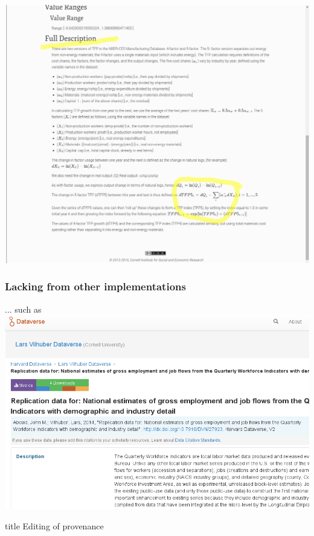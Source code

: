\begin{frame}
	\centering		
	\includegraphics[height=\textheight]{Selection_134_hilite}
\end{frame}

\begin{frame}
	\frametitle{Lacking from other implementations}
	\begin{block}{... such as}
		\centering
		\includegraphics[scale=0.5]{Selection_128}
		
	\end{block}
\end{frame}

\begin{frame}
	\begin{beamercolorbox}[sep=8pt,center]{title}
		Editing of provenance
	\end{beamercolorbox}
\end{frame}


